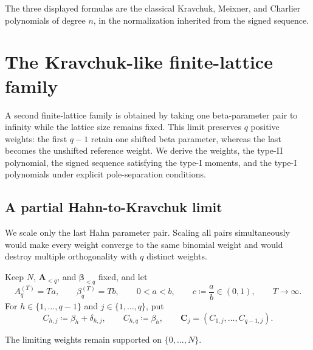 \documentclass[10pt]{amsart}
\newcommand{\A}{\boldsymbol A}
\newcommand{\bbeta}{\boldsymbol\beta}
\theoremstyle{plain}
\theoremstyle{definition}
\theoremstyle{remark}
\begin{document}
The three displayed formulas are the
classical Kravchuk, Meixner, and Charlier polynomials of degree \(n\), in
the normalization inherited from the signed sequence.




\section{The Kravchuk-like finite-lattice family}
\label{sec:Kravchuk}

A second finite-lattice family is obtained by taking one beta-parameter pair
to infinity
while the lattice size remains fixed. This limit preserves \(q\)
positive weights: the first \(q-1\) retain one shifted beta parameter, whereas
the last becomes the unshifted reference weight. We derive the weights, the
type-II polynomial, the signed sequence satisfying the type-I moments, and
the type-I polynomials under explicit
pole-separation conditions.

\subsection{A partial Hahn-to-Kravchuk limit}

We scale only the last Hahn parameter pair. Scaling all pairs
simultaneously would make every weight converge to the same binomial weight
and would destroy multiple orthogonality with \(q\) distinct weights.

Keep \(N\), \(\A_{<q}\), and \(\bbeta_{<q}\) fixed, and let
\begin{equation}
 A_q^{(T)}=Ta,\qquad
 \beta_q^{(T)}=Tb,\qquad
 0<a<b,\qquad
 c\coloneq\frac ab\in(0,1),\qquad T\to\infty.
 \label{eq:K-scaling}
\end{equation}
For \(h\in\{1,\ldots,q-1\}\) and \(j\in\{1,\ldots,q\}\), put
\begin{equation}
 C_{h,j}\coloneq\beta_h+\delta_{h,j},\qquad
 C_{h,q}\coloneq\beta_h,
 \qquad
 \boldsymbol C_j=(C_{1,j},\ldots,C_{q-1,j}).
 \label{eq:K-Cj}
\end{equation}

The limiting weights remain supported on \(\{0,\ldots,N\}\).
\end{document}
